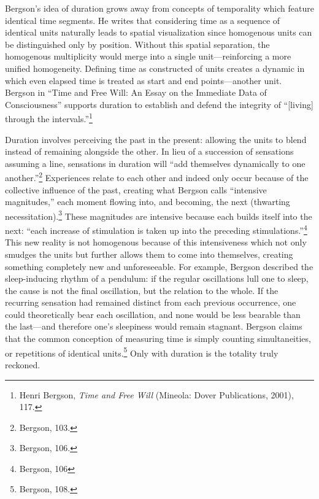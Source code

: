 Bergson's idea of duration grows away from concepts of temporality which
feature identical time segments. He writes that considering time as a
sequence of identical units naturally leads to spatial visualization
since homogenous units can be distinguished only by position. Without
this spatial separation, the homogenous multiplicity would merge into a
single unit---reinforcing a more unified homogeneity. Defining time as
constructed of units creates a dynamic in which even elapsed time is
treated as start and end points---another unit. Bergson in ``Time and
Free Will: An Essay on the Immediate Data of Consciousness'' supports
duration to establish and defend the integrity of ``{[}living{]} through
the intervals.''\footnote{Henri Bergson, \emph{Time and Free Will}
  (Mineola: Dover Publications, 2001), 117.}

Duration involves perceiving the past in the present: allowing the units
to blend instead of remaining alongside the other. In lieu of a
succession of sensations assuming a line, sensations in duration will
``add themselves dynamically to one another.''\footnote{Bergson, 103.}
Experiences relate to each other and indeed only occur because of the
collective influence of the past, creating what Bergson calls
``intensive magnitudes,'' each moment flowing into, and becoming, the
next (thwarting necessitation).\footnote{Bergson, 106.} These magnitudes
are intensive because each builds itself into the next: ``each increase
of stimulation is taken up into the preceding stimulations.''\footnote{Bergson,
  106} This new reality is not homogenous because of this intensiveness
which not only smudges the units but further allows them to come into
themselves, creating something completely new and unforeseeable. For
example, Bergson described the sleep-inducing rhythm of a pendulum: if
the regular oscillations lull one to sleep, the cause is not the final
oscillation, but the relation to the whole. If the recurring sensation
had remained distinct from each previous occurrence, one could
theoretically bear each oscillation, and none would be less bearable
than the last---and therefore one's sleepiness would remain stagnant.
Bergson claims that the common conception of measuring time is simply
counting simultaneities, or repetitions of identical units.\footnote{Bergson,
  108.} Only with duration is the totality truly reckoned.

